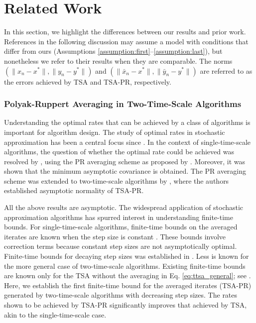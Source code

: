 \section{Related Work}
\label{sec:literature}
In this section, we highlight the differences between our results and prior work.
References in the following discussion may assume a model with conditions that differ from ours (Assumptions \ref{assumption:first}--\ref{assumption:last}), but nonetheless we refer to their results when they are comparable. 
The norms $(\lVert x_n - x^* \rVert, \lVert y_n - y^* \rVert)$ and $(\lVert \bar{x}_n - x^* \rVert, \lVert \bar{y}_n - y^*\rVert)$ are referred to as the errors achieved by TSA and TSA-PR, respectively. 


\subsubsection{Polyak-Ruppert Averaging in Two-Time-Scale Algorithms}\label{sec:PR_TTSA}
Understanding the optimal rates that can be achieved by a class of algorithms is important for algorithm design. 
The study of optimal rates in stochastic approximation has been a central focus since \citep{RobbinsMonro}. 
In the context of single-time-scale algorithms, the question of whether the optimal rate could be achieved was resolved by \citet{polyakJuditsky}, using the PR averaging scheme as proposed by \citet{ruppert,polyak}.
Moreover, it was shown that the minimum asymptotic covariance is obtained. 
The PR averaging scheme was extended to two-time-scale algorithms by \citet{mokkadem2006convergence}, where the authors established asymptotic normality of TSA-PR.



All the above results are asymptotic. 
The widespread application of stochastic approximation algorithms has spurred interest in understanding finite-time bounds. 
For single-time-scale algorithms, finite-time bounds on the averaged iterates are known when the step size is constant \citep{srikant19,mou2020linearstochasticapproximationfinegrained,durmus2024finite}.
These bounds involve correction terms because constant step sizes are not asymptotically optimal. 
Finite-time bounds for decaying step sizes was established in \citep{srikant19,chen2022finite,srikant2024CLT}.
Less is known for the more general case of two-time-scale algorithms. 
Existing finite-time bounds are known only for the TSA without the averaging in Eq. \eqref{eq:ttsa_general}; see \citep{dalal2018finite,kaledin2020finite,haque2023tightfinitetimebounds}. 
Here, we establish the first finite-time bound for the averaged iterates (TSA-PR) generated by two-time-scale algorithms with decreasing step sizes. 
The rates shown to be achieved by TSA-PR significantly improves that achieved by TSA, akin to the single-time-scale case. 




